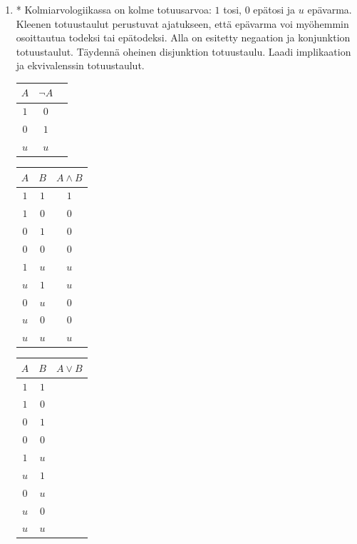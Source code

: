 \begin{enumerate}
\item * Kolmiarvologiikassa on kolme totuusarvoa: $1$
tosi, $0$ epätosi ja $u$ epävarma. Kleenen totuustaulut
perustuvat ajatukseen, että epävarma voi myöhemmin
osoittautua todeksi tai epätodeksi. Alla on esitetty
negaation ja konjunktion totuustaulut. Täydennä
oheinen disjunktion totuustaulu. Laadi implikaation ja
ekvivalenssin totuustaulut.

\begin{center}
\begin{tabular}{|c|c|c|}\hline
$A$ & $\lnot A$ \\ \hline
$1$ & $0$ \\
$0$ & $1$ \\
$u$ & $u$ \\ \hline
\end{tabular}
\qquad
\begin{tabular}{|c|c|c|}\hline
$A$ & $B$ & $A\land B$\\ \hline
$1$ & $1$ & $1$\\
$1$ & $0$ & $0$\\
$0$ & $1$ & $0$\\
$0$ & $0$ & $0$\\
$1$ & $u$ & $u$\\
$u$ & $1$ & $u$\\
$0$ & $u$ & $0$\\
$u$ & $0$ & $0$\\
$u$ & $u$ & $u$\\ \hline
\end{tabular}
\qquad
\begin{tabular}{|c|c|c|}\hline
$A$ & $B$ & $A\lor B$\\ \hline
$1$ & $1$ & \\
$1$ & $0$ & \\
$0$ & $1$ & \\
$0$ & $0$ & \\
$1$ & $u$ & \\
$u$ & $1$ & \\
$0$ & $u$ & \\
$u$ & $0$ & \\
$u$ & $u$ & \\ \hline
\end{tabular}
\end{center}

\end{enumerate}

